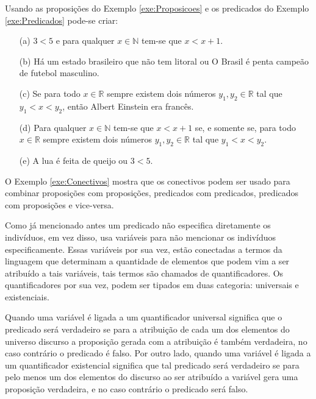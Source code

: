 
\begin{example}\label{exe:Conectivos}
	Usando as proposições do Exemplo \ref{exe:Proposicoes} e os predicados do Exemplo \ref{exe:Predicados} pode-se criar:
	\begin{itemize}
		\item[(a)] $3 < 5$ e para qualquer $x \in\mathbb{N}$ tem-se que $x < x + 1$.
		\item[(b)] Há um estado brasileiro que não tem litoral ou O Brasil é penta campeão de futebol masculino.
		\item[(c)] Se para todo $x \in \mathbb{R}$ sempre existem dois números $y_1, y_2 \in \mathbb{R}$ tal que $y_1 < x < y_2$, então Albert Einstein era francês.
		\item[(d)] Para qualquer $x \in\mathbb{N}$ tem-se que $x < x + 1$ se, e somente se, para todo $x \in \mathbb{R}$ sempre existem dois números $y_1, y_2 \in \mathbb{R}$ tal que $y_1 < x < y_2$.
		\item[(e)] A lua é feita de queijo ou $3 < 5$.
	\end{itemize}
\end{example}

\begin{remark}
    O Exemplo \ref{exe:Conectivos} mostra que os conectivos podem ser usado para combinar proposições com proposições, predicados com predicados, predicados com proposições e vice-versa.
\end{remark}

Como já mencionado antes um predicado não especifica diretamente os indivíduos, em vez disso, usa variáveis para não mencionar os indivíduos especificamente. Essas variáveis por sua vez, estão conectadas a termos da linguagem que determinam a quantidade de elementos que podem vim a ser atribuído a tais variáveis, tais termos são chamados de quantificadores. Os quantificadores por sua vez, podem ser tipados em duas categoria: universais e existenciais. 

Quando uma variável é ligada a um quantificador universal significa que o predicado será verdadeiro se para a atribuição de cada um  dos elementos do universo discurso a proposição gerada com a atribuição é também verdadeira, no caso contrário o predicado é falso. Por outro lado, quando uma variável é ligada a um quantificador existencial significa que tal predicado será verdadeiro se para pelo menos um dos elementos do discurso ao ser atribuído a variável gera uma proposição verdadeira, e no caso contrário o predicado será falso.

